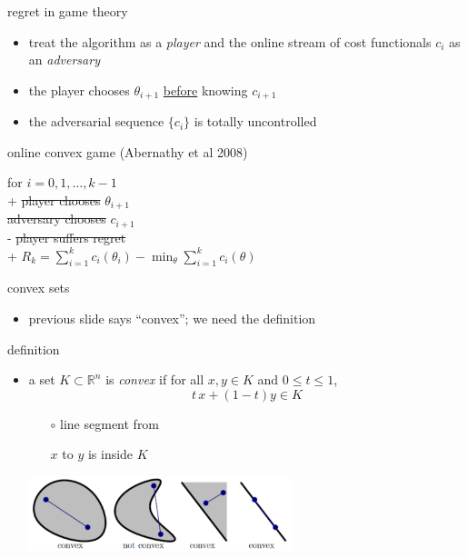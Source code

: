 \documentclass[xcolor={svgnames},
               hyperref={colorlinks,citecolor=DeepPink4,linkcolor=FireBrick,urlcolor=Maroon}]
               {beamer}
\newcommand{\RR}{\mathbb{R}}
\newcommand{\ds}{\displaystyle}
\begin{document}
\begin{frame}{regret in game theory}

\begin{itemize}
\item treat the algorithm as a \emph{player} and the online stream of cost functionals $c_i$ as an \emph{adversary}
\item the player chooses $\theta_{i+1}$ \underline{before} knowing $c_{i+1}$
\item the adversarial sequence $\{c_i\}$ is totally uncontrolled
\end{itemize}

\begin{block}{online convex game (Abernathy et al 2008)}
\begin{pseudo*}
for $i = 0,1,\dots,k-1$ \\+
    \st{player chooses} $\theta_{i+1}$ \\
    \st{adversary chooses} $c_{i+1}$ \\-
\st{player suffers regret} \\+
    $\ds R_k = \sum_{i=1}^k c_i(\theta_i) - \min_\theta \sum_{i=1}^k c_i(\theta)$
\end{pseudo*}
\end{block}
\end{frame}


\begin{frame}{convex sets}

\begin{itemize}
\item previous slide says ``convex''; we need the definition
\end{itemize}

\begin{block}{definition}
\begin{itemize}
\item a set $K \subset \RR^n$ is \emph{convex} if for all $x,y \in K$ and $0 \le t \le 1$,
  $$t\, x + (1-t) y \in K$$

    \begin{itemize}
    \item[$\circ$] line segment from
    \item[]  $x$ to $y$ is inside $K$
    \end{itemize}

\vspace{-8mm}
\hfill \includegraphics[width=0.6\textwidth]{figs/convex}
\end{itemize}
\end{block}
\end{frame}
\end{document}
